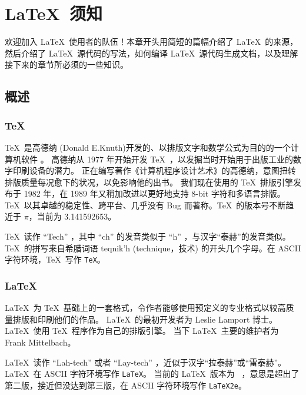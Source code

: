 \chapter{\LaTeX\ 须知}\label{chap:basics}

\begin{intro}
欢迎加入 \LaTeX\ 使用者的队伍！本章开头用简短的篇幅介绍了 \LaTeX\ 的来源，
然后介绍了 \LaTeX\ 源代码的写法，如何编译 \LaTeX\ 源代码生成文档，以及理解接下来的章节所必须的一些知识。
\end{intro}

\section{概述}\label{sec:intro}

\subsection{\protect\TeX}\label{subsec:tex}

\TeX\ 是高德纳 (Donald E.Knuth)开发的、以排版文字和数学公式为目的的一个计算机软件 \cite{texbook}。
高德纳从 1977 年开始开发 \TeX\ ，以发掘当时开始用于出版工业的数字印刷设备的潜力。
正在编写著作《计算机程序设计艺术》的高德纳，意图扭转排版质量每况愈下的状况，以免影响他的出书。
我们现在使用的 \TeX\ 排版引擎发布于 1982 年，在 1989 年又稍加改进以更好地支持 8-bit 字符和多语言排版。
\TeX\ 以其卓越的稳定性、跨平台、几乎没有 Bug 而著称。\TeX\ 的版本号不断趋近于 $\pi$，当前为 3.141592653。

\TeX\ 读作 ``Tech'' ，其中 ``ch'' 的发音类似于 ``h'' ，与汉字“泰赫”的发音类似。\TeX\ 的拼写来自希腊词语
{\selectfont teqnik'h} (technique，技术) 的开头几个字母。在 ASCII 字符环境，\TeX\ 写作 \texttt{TeX}。

\subsection{\LaTeX}\label{subsec:latex}

\LaTeX\ 为 \TeX\ 基础上的一套格式，令作者能够使用预定义的专业格式以较高质量排版和印刷他们的作品。
\LaTeX\ 的最初开发者为 Leslie Lamport 博士\cite{manual}。\LaTeX\ 使用 \TeX\ 程序作为自己的排版引擎。
当下 \LaTeX\ 主要的维护者为 Frank Mittelbach。

\LaTeX\ 读作 ``Lah-tech'' 或者 ``Lay-tech'' ，近似于汉字“拉泰赫”或“雷泰赫”。\LaTeX\ 在 ASCII 字符环境写作 \texttt{LaTeX}。
当前的 \LaTeX\ 版本为 \LaTeXe\ ，意思是超出了第二版，接近但没达到第三版，在 ASCII 字符环境写作 \texttt{LaTeX2e}。

